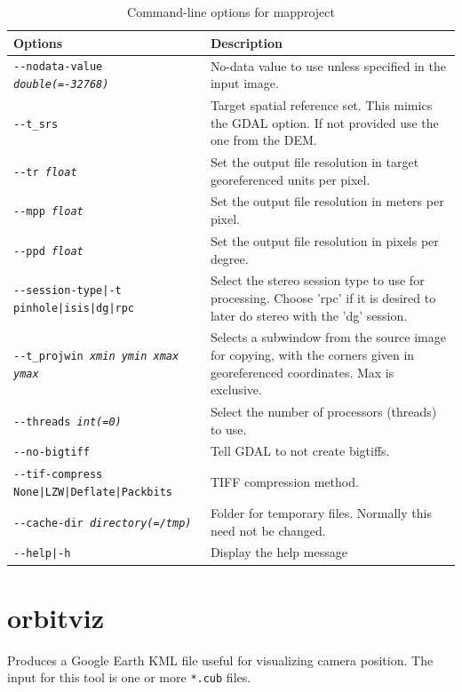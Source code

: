 \begin{longtable}{|l|p{10cm}|}
\caption{Command-line options for mapproject}
\label{tbl:mapproject}
\endfirsthead
\endhead
\endfoot
\endlastfoot
\hline
Options & Description \\ \hline \hline
\texttt{-\/-nodata-value \textit{double(=-32768)}} & No-data value to use unless specified in the input image. \\ \hline
\texttt{-\/-t\_srs} & Target spatial reference set. This mimics the GDAL
option. If not provided use the one from the DEM. \\ \hline
\texttt{-\/-tr \textit{float}} & Set the output file resolution in target
  georeferenced units per pixel. \\ \hline
\texttt{-\/-mpp \textit{float}} & Set the output file resolution in meters per
pixel. \\ \hline
\texttt{-\/-ppd \textit{float}} & Set the output file resolution in pixels per
degree. \\ \hline
\texttt{-\/-session-type|-t pinhole|isis|dg|rpc} & Select the stereo
session type to use for processing. Choose 'rpc' if it is desired to later do stereo with the 'dg' session. \\ \hline
\texttt{-\/-t\_projwin \textit{xmin ymin xmax ymax}} & Selects a subwindow from the source image for copying, with the corners given in georeferenced coordinates. Max is exclusive. \\ \hline
\texttt{-\/-threads \textit{int(=0)}} & Select the number of processors (threads) to use.\\ \hline
\texttt{-\/-no-bigtiff} & Tell GDAL to not create bigtiffs.\\ \hline
\texttt{-\/-tif-compress None|LZW|Deflate|Packbits} & TIFF compression method.\\ \hline
\texttt{-\/-cache-dir \textit{directory(=/tmp)}} & Folder for temporary files. Normally this need not be changed.\\ \hline
\texttt{-\/-help|-h} & Display the help message\\ \hline
\end{longtable}

\clearpage

\section{orbitviz}
\label{orbitviz}

Produces a Google Earth \ac{KML} file useful for visualizing camera
position. The input for this tool is one or more \texttt{*.cub} files.


